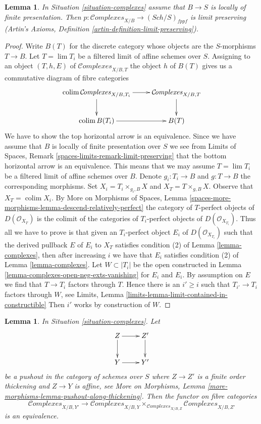 \documentclass[10pt,a4paper]{amsart}
\theoremstyle{plain}
\newtheorem{lemma}[subsection]{Lemma}
\theoremstyle{definition}
\theoremstyle{remark}
\numberwithin{equation}{subsection}
\def\lim{\mathop{\mathrm{lim}}\nolimits}
\def\colim{\mathop{\mathrm{colim}}\nolimits}
\def\Sch{\mathit{Sch}}
\def\Complexesstack{\mathcal{C}\!\mathit{omplexes}}
\begin{document}
\begin{lemma}
\label{lemma-complexes-limits}
In Situation \ref{situation-complexes} assume that $B \to S$
is locally of finite presentation. Then
$p : \Complexesstack_{X/B} \to (\Sch/S)_{fppf}$ is limit preserving
(Artin's Axioms, Definition \ref{artin-definition-limit-preserving}).
\end{lemma}

\begin{proof}
Write $B(T)$ for the discrete category whose
objects are the $S$-morphisms $T \to B$. Let $T = \lim T_i$ be a filtered
limit of affine schemes over $S$. Assigning to an object
$(T, h, E)$ of $\Complexesstack_{X/B, T}$ the object $h$
of $B(T)$ gives us a commutative diagram of fibre categories
$$
\xymatrix{
\colim \Complexesstack_{X/B, T_i} \ar[r] \ar[d] &
\Complexesstack_{X/B, T} \ar[d] \\
\colim B(T_i) \ar[r] & B(T)
}
$$
We have to show the top horizontal arrow is an equivalence. Since
we have assume that $B$ is locally of finite presentation over $S$
we see from
Limits of Spaces, Remark \ref{spaces-limits-remark-limit-preserving}
that the bottom horizontal arrow is an equivalence. This means that
we may assume $T = \lim T_i$ be a filtered limit of affine schemes over
$B$. Denote $g_i : T_i \to B$ and $g : T \to B$ the corresponding
morphisms. Set $X_i = T_i \times_{g_i, B} X$ and $X_T = T \times_{g, B} X$.
Observe that $X_T = \colim X_i$.
By More on Morphisms of Spaces, Lemma
\ref{spaces-more-morphisms-lemma-descend-relatively-perfect}
the category of $T$-perfect objects of $D(\mathcal{O}_{X_T})$
is the colimit of the categories of $T_i$-perfect objects
of $D(\mathcal{O}_{X_{T_i}})$.
Thus all we have to prove is that given an $T_i$-perfect object
$E_i$ of $D(\mathcal{O}_{X_{T_i}})$ such that
the derived pullback $E$ of $E_i$ to $X_T$ satisfies
condition (2) of Lemma \ref{lemma-complexes},
then after increasing $i$ we have that
$E_i$ satisfies
condition (2) of Lemma \ref{lemma-complexes}.
Let $W \subset |T_i|$ be the open constructed
in Lemma \ref{lemma-complexes-open-neg-exts-vanishing}
for $E_i$ and $E_i$. By assumption on $E$ we find
that $T \to T_i$ factors through $T$.
Hence there is an $i' \geq i$
such that $T_{i'} \to T_i$ factors through $W$, see
Limits, Lemma \ref{limits-lemma-limit-contained-in-constructible}
Then $i'$ works by construction of $W$.
\end{proof}

\begin{lemma}
\label{lemma-complexes-RS-star}
In Situation \ref{situation-complexes}. Let
$$
\xymatrix{
Z \ar[r] \ar[d] & Z' \ar[d] \\
Y \ar[r] & Y'
}
$$
be a pushout in the category of schemes over $S$ where
$Z \to Z'$ is a finite order thickening and $Z \to Y$ is affine, see
More on Morphisms, Lemma \ref{more-morphisms-lemma-pushout-along-thickening}.
Then the functor on fibre categories
$$
\Complexesstack_{X/B, Y'}
\longrightarrow
\Complexesstack_{X/B, Y}
\times_{\Complexesstack_{X/B, Z}}
\Complexesstack_{X/B, Z'}
$$
is an equivalence.
\end{lemma}
\end{document}
